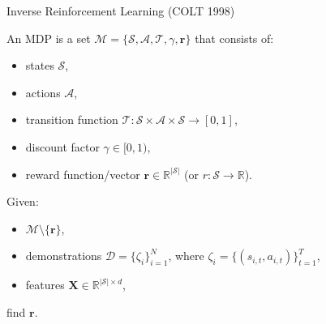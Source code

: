 \documentclass{beamer}
\begin{document}
\begin{frame}{Inverse Reinforcement Learning (COLT 1998)}
  \begin{definition}
    An MDP is a set $\mathcal{M} = \{\mathcal{S}, \mathcal{A}, \mathcal{T},
    \gamma, \mathbf{r} \}$ that consists of:
    \begin{itemize}
    \item states $\mathcal{S}$,
    \item actions $\mathcal{A}$,
    \item transition function $\mathcal{T} : \mathcal{S} \times \mathcal{A}
      \times \mathcal{S} \to [0, 1]$,
    \item discount factor $\gamma \in [0, 1)$,
    \item reward function/vector $\mathbf{r} \in \mathbb{R}^{|\mathcal{S}|}$ (or
      $r : \mathcal{S} \to \mathbb{R}$).
    \end{itemize}
  \end{definition}
  \pause
  \begin{definition}
    Given:
    \begin{itemize}
    \item $\mathcal{M} \setminus \{ \mathbf{r} \}$,
    \item demonstrations $\mathcal{D} = \{ \zeta_i \}_{i=1}^N$, where $\zeta_i =
      \{ (s_{i,t}, a_{i,t}) \}_{t=1}^T$,
    \item features $\mathbf{X} \in \mathbb{R}^{|\mathcal{S}| \times d}$,
    \end{itemize}
    find $\mathbf{r}$.
  \end{definition}
\end{frame}
\end{document}
